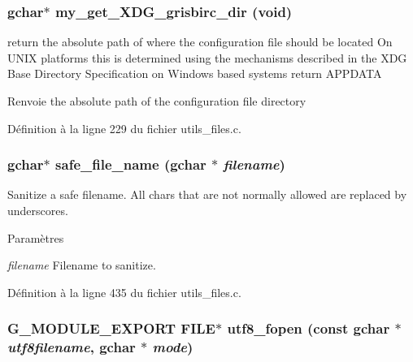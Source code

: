 \subsubsection[{my\_\-get\_\-XDG\_\-grisbirc\_\-dir}]{\setlength{\rightskip}{0pt plus 5cm}gchar$\ast$ my\_\-get\_\-XDG\_\-grisbirc\_\-dir (void)}\label{utils__files_8h_a1794f2646f6aa227df941dfd0f63b9b4}
return the absolute path of where the configuration file should be located On UNIX platforms this is determined using the mechanisms described in the XDG Base Directory Specification on Windows based systems return APPDATA

\begin{DoxyReturn}{Renvoie}
the absolute path of the configuration file directory 
\end{DoxyReturn}


Définition à la ligne 229 du fichier utils\_\-files.c.

\subsubsection[{safe\_\-file\_\-name}]{\setlength{\rightskip}{0pt plus 5cm}gchar$\ast$ safe\_\-file\_\-name (gchar $\ast$ {\em filename})}\label{utils__files_8h_a3a57f67068b5f1274d722eac4cd5a9e6}
Sanitize a safe filename. All chars that are not normally allowed are replaced by underscores.


\begin{DoxyParams}{Paramètres}
\item[{\em filename}]Filename to sanitize. \end{DoxyParams}


Définition à la ligne 435 du fichier utils\_\-files.c.

\subsubsection[{utf8\_\-fopen}]{\setlength{\rightskip}{0pt plus 5cm}G\_\-MODULE\_\-EXPORT FILE$\ast$ utf8\_\-fopen (const gchar $\ast$ {\em utf8filename}, \/  gchar $\ast$ {\em mode})}\label{utils__files_8h_ac113fb5932da8fd819f73d967a90c219}


